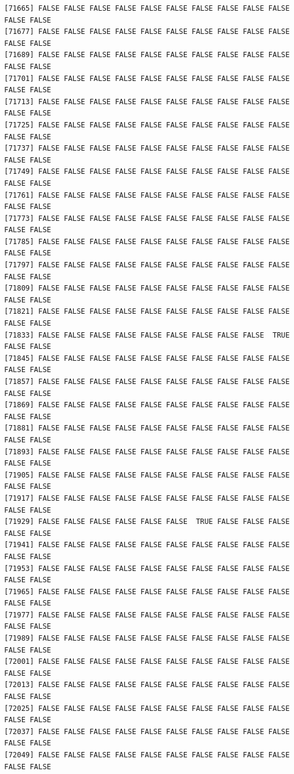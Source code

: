 \documentclass[
  a4paper,
  DIV=11,
  numbers=noendperiod]{scrartcl}
\begin{document}
\begin{verbatim}
[71665] FALSE FALSE FALSE FALSE FALSE FALSE FALSE FALSE FALSE FALSE FALSE FALSE
[71677] FALSE FALSE FALSE FALSE FALSE FALSE FALSE FALSE FALSE FALSE FALSE FALSE
[71689] FALSE FALSE FALSE FALSE FALSE FALSE FALSE FALSE FALSE FALSE FALSE FALSE
[71701] FALSE FALSE FALSE FALSE FALSE FALSE FALSE FALSE FALSE FALSE FALSE FALSE
[71713] FALSE FALSE FALSE FALSE FALSE FALSE FALSE FALSE FALSE FALSE FALSE FALSE
[71725] FALSE FALSE FALSE FALSE FALSE FALSE FALSE FALSE FALSE FALSE FALSE FALSE
[71737] FALSE FALSE FALSE FALSE FALSE FALSE FALSE FALSE FALSE FALSE FALSE FALSE
[71749] FALSE FALSE FALSE FALSE FALSE FALSE FALSE FALSE FALSE FALSE FALSE FALSE
[71761] FALSE FALSE FALSE FALSE FALSE FALSE FALSE FALSE FALSE FALSE FALSE FALSE
[71773] FALSE FALSE FALSE FALSE FALSE FALSE FALSE FALSE FALSE FALSE FALSE FALSE
[71785] FALSE FALSE FALSE FALSE FALSE FALSE FALSE FALSE FALSE FALSE FALSE FALSE
[71797] FALSE FALSE FALSE FALSE FALSE FALSE FALSE FALSE FALSE FALSE FALSE FALSE
[71809] FALSE FALSE FALSE FALSE FALSE FALSE FALSE FALSE FALSE FALSE FALSE FALSE
[71821] FALSE FALSE FALSE FALSE FALSE FALSE FALSE FALSE FALSE FALSE FALSE FALSE
[71833] FALSE FALSE FALSE FALSE FALSE FALSE FALSE FALSE FALSE  TRUE FALSE FALSE
[71845] FALSE FALSE FALSE FALSE FALSE FALSE FALSE FALSE FALSE FALSE FALSE FALSE
[71857] FALSE FALSE FALSE FALSE FALSE FALSE FALSE FALSE FALSE FALSE FALSE FALSE
[71869] FALSE FALSE FALSE FALSE FALSE FALSE FALSE FALSE FALSE FALSE FALSE FALSE
[71881] FALSE FALSE FALSE FALSE FALSE FALSE FALSE FALSE FALSE FALSE FALSE FALSE
[71893] FALSE FALSE FALSE FALSE FALSE FALSE FALSE FALSE FALSE FALSE FALSE FALSE
[71905] FALSE FALSE FALSE FALSE FALSE FALSE FALSE FALSE FALSE FALSE FALSE FALSE
[71917] FALSE FALSE FALSE FALSE FALSE FALSE FALSE FALSE FALSE FALSE FALSE FALSE
[71929] FALSE FALSE FALSE FALSE FALSE FALSE  TRUE FALSE FALSE FALSE FALSE FALSE
[71941] FALSE FALSE FALSE FALSE FALSE FALSE FALSE FALSE FALSE FALSE FALSE FALSE
[71953] FALSE FALSE FALSE FALSE FALSE FALSE FALSE FALSE FALSE FALSE FALSE FALSE
[71965] FALSE FALSE FALSE FALSE FALSE FALSE FALSE FALSE FALSE FALSE FALSE FALSE
[71977] FALSE FALSE FALSE FALSE FALSE FALSE FALSE FALSE FALSE FALSE FALSE FALSE
[71989] FALSE FALSE FALSE FALSE FALSE FALSE FALSE FALSE FALSE FALSE FALSE FALSE
[72001] FALSE FALSE FALSE FALSE FALSE FALSE FALSE FALSE FALSE FALSE FALSE FALSE
[72013] FALSE FALSE FALSE FALSE FALSE FALSE FALSE FALSE FALSE FALSE FALSE FALSE
[72025] FALSE FALSE FALSE FALSE FALSE FALSE FALSE FALSE FALSE FALSE FALSE FALSE
[72037] FALSE FALSE FALSE FALSE FALSE FALSE FALSE FALSE FALSE FALSE FALSE FALSE
[72049] FALSE FALSE FALSE FALSE FALSE FALSE FALSE FALSE FALSE FALSE FALSE FALSE

\end{verbatim}
\end{document}

